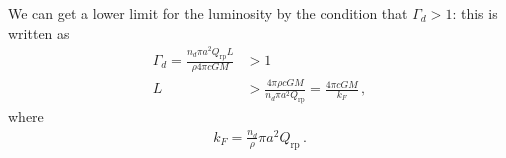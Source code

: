 \documentclass[main.tex]{subfiles}
\begin{document}
We can get a lower limit for the luminosity by the condition that \(\Gamma_{d}>1\): this is written as 
%
\begin{align}
\Gamma_{d} = \frac{n_d \pi a^2 Q _{\text{rp}} L}{\rho 4 \pi c GM}
&>1  \\
L &> \frac{4 \pi \rho c GM}{n_d \pi a^2 Q _{\text{rp}}} = \frac{4 \pi c GM}{k_F}
\,,
\end{align}
%
where 
%
\begin{align}
k_F = \frac{n_d}{\rho } \pi a^2 Q _{\text{rp}}
\,.
\end{align}
\end{document}
